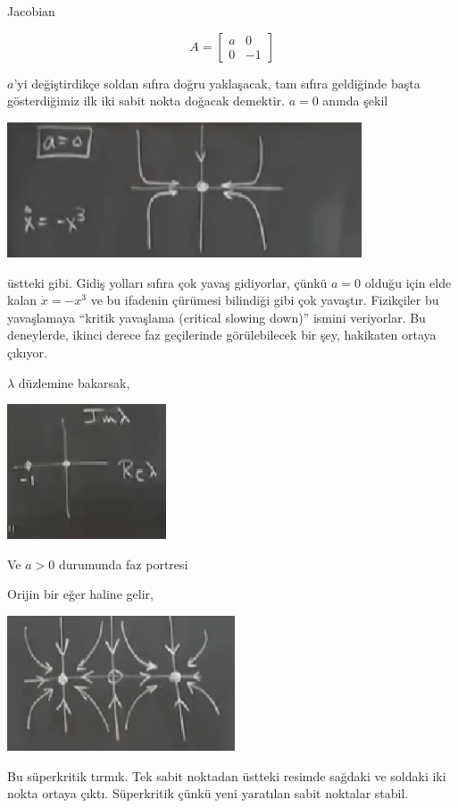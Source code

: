 \documentclass[12pt,fleqn]{article}\usepackage{../../common}
\begin{document}
Jacobian

$$ A = \left[\begin{array}{rrr}
a & 0 \\ 0 & -1
\end{array}\right] $$

$a$'yi değiştirdikçe soldan sıfıra doğru yaklaşacak, tam sıfıra geldiğinde başta
gösterdiğimiz ilk iki sabit nokta doğacak demektir. $a=0$ anında şekil 

\includegraphics[height=4cm]{12_18.png}

üstteki gibi. Gidiş yolları sıfıra çok yavaş gidiyorlar, çünkü $a=0$ olduğu için
elde kalan $\dot{x} = -x^3$ ve bu ifadenin çürümesi bilindiği gibi çok
yavaştır. Fizikçiler bu yavaşlamaya ``kritik yavaşlama (critical slowing down)''
ismini veriyorlar. Bu deneylerde, ikinci derece faz geçilerinde görülebilecek
bir şey, hakikaten ortaya çıkıyor.

$\lambda$ düzlemine bakarsak,

\includegraphics[height=4cm]{12_19.png}

Ve $a>0$ durumunda faz portresi

Orijin bir eğer haline gelir, 

\includegraphics[height=4cm]{12_20.png}

Bu süperkritik tırmık. Tek sabit noktadan üstteki resimde sağdaki ve soldaki iki
nokta ortaya çıktı. Süperkritik çünkü yeni yaratılan sabit noktalar stabil. 
\end{document}
